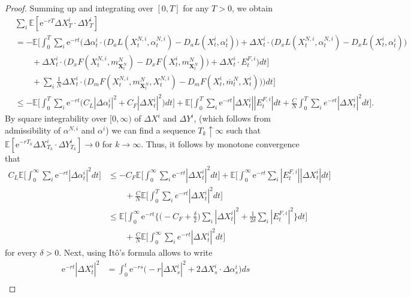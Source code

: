 \documentclass[11pt,reqno]{amsart}
\numberwithin{equation}{section}
\theoremstyle{definition}
\def\E{{\mathbb E}}
\newcommand{\bX}{\mathbf{X}}
\newcommand{\ov}{\overline}
\def \E{\mathbb{E}}
\def \e{\mathrm{e}}
\begin{document}
\begin{proof}
  Summing up and integrating over $[0,T]$ for any $T>0$, we obtain
  \begin{align*}
  &\sum_i\E[\e^{-rT}\Delta X^i_T\cdot\Delta Y^i_T]\\
  & =-\E\bigg[ \int_0^T \sum_i \e^{-rt}\bigg(\Delta \alpha_t^i \cdot \big(D_a L(X_t^{N,i}, \alpha_t^{N,i}) - D_a L(X_t^i, \alpha_t^i) \big) + \Delta X_t^i \cdot \big(D_x L(X_t^{N,i}, \alpha_t^{N,i}) - D_x L(X_t^i, \alpha_t^i) \big) \nonumber \\
  & \quad \quad + \Delta X_t^i \cdot \big(D_x F(X_t^{N,i}, m_{\bX_t^N}^N) - D_x F(X_t^i, m_{\bX^N_t}^N)\big) + \Delta X_t^{i} \cdot E_t^{F,i} \bigg) dt \bigg] \\
  & \quad \quad + \sum_i \frac{1}{N} \Delta X_t^i \cdot \big( D_m F(X_t^{N,i}, m_{\bX_t^N}^N, X_t^{N,i}) - D_m F(X_t^{i}, \ov{m}_t^N, X_t^i)\big) \bigg) dt \bigg] \\
 & \le -\E\bigg[\int_0^T\sum_i\e^{-rt}\Big(C_L|\Delta \alpha^i_t|^2 + C_F|\Delta X^i_t|^2\Big)dt\bigg] + \E\bigg[\int_0^T\sum_i\e^{-rt}|\Delta X^{i}_t||E^{F,i}_t|dt 
 + \frac{C}{N} \int_0^T  \sum_i e^{-rt} |\Delta X_t^i|^2 dt \bigg].
\end{align*}
  By square integrability over $[0,\infty)$ of $\Delta X^i$ and $\Delta Y^i$, (which follows from admissibility of $\alpha^{N,i}$ and $\alpha^i$) we can find a sequence $T_k\uparrow \infty$ such that $\E[\e^{-rT_k}\Delta X^i_{T_k}\cdot\Delta Y^i_{T_k}] \to 0$ for $k\to \infty$.
  Thus, it follows by monotone convergence that
\begin{align}
\nonumber
  C_L \E \bigg[\int_0^\infty \sum_i \e^{-rt}|\Delta \alpha_t^i|^2 dt \bigg]  \label{eq:estim.C_F} 
  &\leq - C_F \E \bigg[\int_0^\infty \sum_i \e^{-rt}|\Delta X_t^i|^2 dt \bigg] + \E \bigg[ \int_0^\infty\e^{-rt}  \sum_i |E_t^{F,i}||\Delta X_t^i|  dt \bigg] \nonumber  \\
  &\qquad + \frac{C}{N}\E\bigg[  \int_0^T  \sum_i e^{-rt} |\Delta X_t^i|^2 dt \bigg]
  \nonumber \\
  &\leq \E\bigg[ \int_0^\infty\e^{-rt} \Big\{ \Big(-C_F+\frac{\delta}{2}\Big) \sum_i |\Delta X_t^i|^2 + \frac{1}{2\delta}\sum_i |E_t^{F,i}|^2  \Big\} dt \bigg] \nonumber \\
  &\qquad + \frac{C}{N} \E\bigg[  \int_0^\infty  \sum_i e^{-rt} |\Delta X_t^i|^2 dt \bigg]
\end{align}
for every $\delta>0$.
Next, using It\^o's formula allows to write
\begin{align*}
    \e^{-rt}|\Delta X^{i}_t|^2 &=  \int_0^t\e^{-rs}\Big( -r|\Delta X^{i}_s|^2 + 2\Delta X^{i}_s\cdot\Delta \alpha^{i}_s  \Big)ds \\

\end{align*}
\end{proof}
\end{document}
